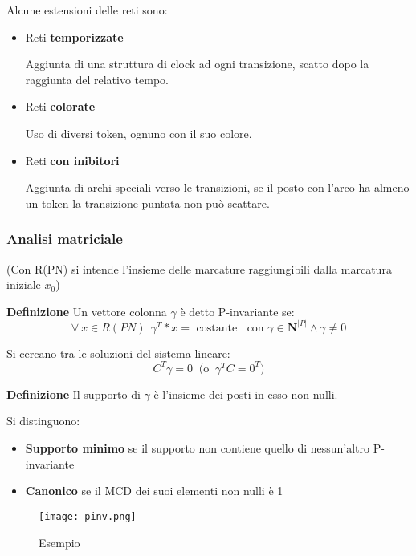 \documentclass{article}
\newcommand{\df}[1]{\noindent\textbf{Definizione } #1.\newline}
\begin{document}
\noindent Alcune estensioni delle reti sono:
\begin{itemize}
    \item Reti \textbf{temporizzate}

        Aggiunta di una struttura di clock ad ogni transizione, scatto dopo la raggiunta del relativo tempo.

    \item Reti \textbf{colorate}

        Uso di diversi token, ognuno con il suo colore.

    \item Reti \textbf{con inibitori}

        Aggiunta di archi speciali verso le transizioni, se il posto con l'arco ha almeno un token la transizione puntata non può scattare.\newline
    
\end{itemize}

\subsubsection{Analisi matriciale}

(Con R(PN) si intende l'insieme delle marcature raggiungibili dalla marcatura iniziale $x_0$)\newline

\noindent\textbf{Definizione} Un vettore colonna $\gamma$ è detto P-invariante se:
$$\forall\ x\in R(PN) \ \ \gamma^T*x=\text{ costante }\ \text{ con } \gamma\in\mathbf{N}^{|P|}\wedge \gamma\neq0$$

\noindent Si cercano tra le soluzioni del sistema lineare:
$$C^T\gamma=0\ \text{ (o }\ \gamma^TC=0^T)$$\newline

\df{Il supporto di $\gamma$ è l'insieme dei posti in esso non nulli}

\noindent Si distinguono:
\begin{itemize}
    \item \textbf{Supporto minimo} se il supporto non contiene quello di nessun'altro P-invariante
    \item \textbf{Canonico} se il MCD dei suoi elementi non nulli è 1
\end{itemize}

\begin{figure}[ht]
    \centering
    \texttt{[image: pinv.png]}
    \caption{Esempio}
\end{figure}
\end{document}
